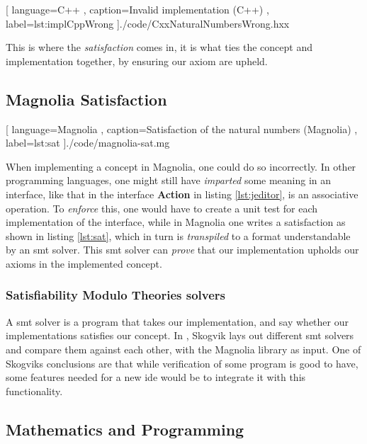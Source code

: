 \begin{code}[H]
  
    [ language=C++
    , caption={Invalid implementation (C++)}
    , label=lst:implCppWrong
    ]{./code/CxxNaturalNumbersWrong.hxx}
\end{code}

This is where the
\textit{satisfaction} comes in, it is what ties the concept and implementation
together, by ensuring our axiom are upheld.

\subsection{Magnolia Satisfaction}

\begin{center}
  
    [ language=Magnolia
    , caption={Satisfaction of the natural numbers (Magnolia)}
    , label=lst:sat
    ]{./code/magnolia-sat.mg}
\end{center}

When implementing a concept in Magnolia, one could do so incorrectly. In other
programming languages, one might still have \textit{imparted} some meaning in an
interface, like that in the interface \textbf{Action} in listing
\ref{lst:jeditor}, is an associative operation. To \textit{enforce} this, one
would have to create a unit test for each implementation of the interface, while
in Magnolia one writes a satisfaction as shown in listing \ref{lst:sat}, which
in turn is \textit{transpiled} to a format understandable by an \gls{smt}
solver. This \gls{smt} solver can \textit{prove} that our implementation upholds
our axioms in the implemented concept.

\subsubsection{Satisfiability Modulo Theories solvers}

A \gls{smt} solver is a program that takes our implementation, and say whether
our implementations satisfies our concept. In \cite{beateVerification}, Skogvik
lays out different \gls{smt} solvers and compare them against each other, with
the Magnolia library as input. One of Skogviks conclusions are that while
verification of some program is good to have, some features needed for a new
\gls{ide} would be to integrate it with this functionality.


\subsection{Mathematics and Programming}

